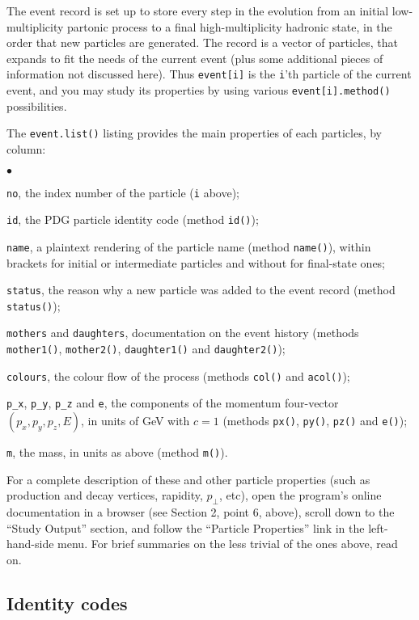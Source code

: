 \documentclass[12pt,a4paper]{article}
\newenvironment{Itemize}{\begin{list}{$\bullet$}%
{\setlength{\topsep}{0.4mm}\setlength{\partopsep}{0.4mm}%
\setlength{\itemsep}{0.4mm}\setlength{\parsep}{0.4mm}}}%
{\end{list}}
\begin{document}
The event record is set up to store every step in the evolution from 
an initial low-multiplicity partonic process to a final high-multiplicity
hadronic state, in the order that new particles are generated. The record
is a vector of particles, that expands to fit the needs of the current 
event (plus some additional pieces of information not discussed here). 
Thus \texttt{event[i]} is the \texttt{i}'th particle of the current 
event, and you may study its properties by using various 
\texttt{event[i].method()} possibilities.

The \texttt{event.list()} listing provides the main properties of 
each particles, by column:
\begin{Itemize}
\item \texttt{no}, the index number of the particle (\texttt{i}
above);
\item \texttt{id}, the PDG particle identity code 
(method \texttt{id()});
\item \texttt{name}, a plaintext rendering of the particle name 
(method \texttt{name()}), within brackets for initial or intermediate 
particles and without for final-state ones;
\item \texttt{status}, the reason why a new particle was added to 
the event record (method \texttt{status()});
\item \texttt{mothers} and \texttt{daughters}, documentation on
the event history (methods \texttt{mother1()}, \texttt{mother2()}, 
\texttt{daughter1()} and \texttt{daughter2()});
\item \texttt{colours}, the colour flow of the process (methods 
\texttt{col()} and \texttt{acol()});
\item \texttt{p\_x}, \texttt{p\_y}, \texttt{p\_z} and \texttt{e}, 
the components of the momentum four-vector $(p_x, p_y, p_z, E)$,
in units of GeV with $c = 1$ (methods \texttt{px()}, \texttt{py()}, 
\texttt{pz()} and \texttt{e()});
\item \texttt{m}, the mass, in units as above (method \texttt{m()}).
\end{Itemize}
For a complete description of these and other particle properties 
(such as production and decay vertices, rapidity, $p_\perp$, etc), 
open the program's online documentation in a browser (see Section 2,
point 6, above), scroll down to the ``Study Output'' section, and follow
the ``Particle Properties'' link in the left-hand-side menu.  For brief
summaries on the less trivial of the ones above, read on.

\subsection{Identity codes}
\end{document}
